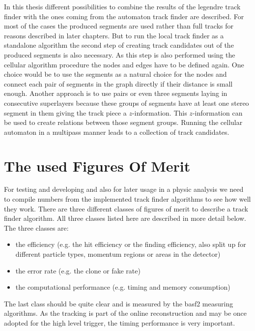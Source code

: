 In this thesis different possibilities to combine the results of the legendre track finder with the ones coming from the automaton track finder are described. For most of the cases the produced segments are used rather than full tracks for reasons described in later chapters. But to run the local track finder as a standalone algorithm the second step of creating track candidates out of the produced segments is also necessary. As this step is also performed using the cellular algorithm procedure the nodes and edges have to be defined again. One choice would be to use the segments as a natural choice for the nodes and connect each pair of segments in the graph directly if their distance is small enough. Another approach is to use pairs or even three segments laying in consecutive superlayers because these groups of segments have at least one stereo segment in them giving the track piece a $z$-information. This $z$-information can be used to create relations between those segment groups. Running the cellular automaton in a multipass manner leads to a collection of track candidates.


\section{The used Figures Of Merit}

For testing and developing and also for later usage in a physic analysis we need to compile numbers from the implemented track finder algorithms to see how well they work. There are three different classes of figures of merit to describe a track finder algorithm. All three classes listed here are described in more detail below. The three classes are:
\begin{itemize}
  \item the efficiency (e.g. the hit efficiency or the finding efficiency, also split up for different particle types, momentum regions or areas in the detector)
  \item the error rate (e.g. the clone or fake rate)
  \item the computational performance (e.g. timing and memory consumption)
\end{itemize}

The last class should be quite clear and is measured by the basf2 measuring algorithms. As the tracking is part of the online reconstruction and may be once adopted for the high level trigger, the timing performance is very important. 

